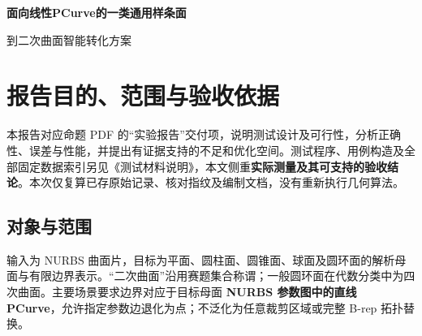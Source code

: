 \documentclass[UTF8,zihao=5,fontset=windows,a4paper]{ctexart}
\begin{document}
\thispagestyle{first}
\begin{center}
{\fontsize{18}{25}\selectfont\bfseries\color{ink}面向线性PCurve的一类通用样条面\par 到二次曲面智能转化方案\par}
\vspace{5pt}{\large 测试报告（实验报告）}\par
{}
\end{center}
\section{报告目的、范围与验收依据}
本报告对应命题 PDF 的“实验报告”交付项，说明测试设计及可行性，分析正确性、误差与性能，并提出有证据支持的不足和优化空间。测试程序、用例构造及全部固定数据索引另见《测试材料说明》，本文侧重\textbf{实际测量及其可支持的验收结论}。本次仅复算已存原始记录、核对指纹及编制文档，没有重新执行几何算法。

\subsection{对象与范围}
输入为 NURBS 曲面片，目标为平面、圆柱面、圆锥面、球面及圆环面的解析母面与有限边界表示。“二次曲面”沿用赛题集合称谓；一般圆环面在代数分类中为四次曲面。主要场景要求边界对应于目标母面 \textbf{NURBS 参数图中的直线 PCurve}，允许指定参数边退化为点；不泛化为任意裁剪区域或完整 B-rep 拓扑替换。
\end{document}
